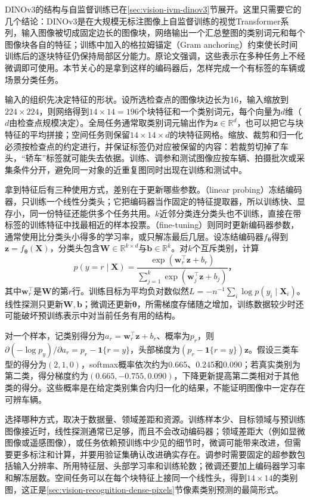 DINOv3的结构与自监督训练已在\ref{sec:vision-ivm-dinov3}节展开。这里只需要它的几个结论：DINOv3是在大规模无标注图像上自监督训练的视觉Transformer系列，输入图像被切成固定边长的图像块，网络输出一个汇总整图的类别词元和每个图像块各自的特征；训练中加入的格拉姆锚定（Gram anchoring）约束使长时间训练后的逐块特征仍保持局部区分能力。原论文强调，这些表示在多种任务上不经微调即可使用。本节关心的是拿到这样的编码器后，怎样完成一个有标签的车辆或场景分类任务。

输入的组织先决定特征的形状。设所选检查点的图像块边长为16，输入缩放到$224\times224$，则网络得到$14\times14=196$个块特征和一个类别词元，每个向量为$d$维（$d$由检查点规模决定）。全局任务通常取类别词元输出作为$\bm{z}\in\mathbb{R}^{d}$，也可以把它与块特征的平均拼接；空间任务则保留$14\times14\times d$的块特征网格。缩放、裁剪和归一化必须按检查点的约定进行，并保证标签仍对应被保留的内容：若裁剪切掉了车头，“轿车”标签就可能失去依据。训练、调参和测试图像应按车辆、拍摄批次或采集条件分开，避免同一对象的近重复图同时出现在训练和测试中。

拿到特征后有三种使用方式，差别在于更新哪些参数。（linear probing）冻结编码器，只训练一个线性分类头；它把编码器当作固定的特征提取器，所以训练快、显存小，同一份特征还能供多个任务共用。$k$近邻分类连分类头也不训练，直接在带标签的训练特征中找最相近的样本投票。（fine-tuning）则同时更新编码器参数，通常使用比分类头小得多的学习率，或只解冻最后几层。设冻结编码器$f_{\bm{\theta}}$得到$\bm{z}=f_{\bm{\theta}}(\bm{X})$，分类头包含$\bm{W}\in\mathbb{R}^{k\times d}$与$\bm{b}\in\mathbb{R}^{k}$。对$k$个互斥类别，计算
\begin{equation}
 p(y=r\mid\bm{X})=
 \frac{\exp(\bm{w}_r^\top\bm{z}+b_r)}
 {\sum_{j=1}^{k}\exp(\bm{w}_j^\top\bm{z}+b_j)}\text{，}
 \label{eq:vision-linear-head}
\end{equation}
其中$\bm{w}_r^\top$是$\bm{W}$的第$r$行。训练目标为平均负对数似然$L=-n^{-1}\sum_i\log p(y_i\mid\bm X_i)$。线性探测只更新$\bm{W},\bm{b}$；微调还更新$\bm{\theta}$，所需梯度存储随之增加，训练数据较少时还可能破坏预训练表示中对当前任务有用的结构。

对一个样本，记类别得分为$a_r=\bm{w}_r^\top\bm{z}+b_r$、概率为$p_r$，则$\partial(-\log p_y)/\partial a_r=p_r-\mathbf{1}\{r=y\}$，头部梯度为$(p_r-\mathbf{1}\{r=y\})\bm{z}$。假设三类车型的得分为$(2,1,0)$，softmax概率依次约为0.665、0.245和0.090；若真实类别为第二类，得分梯度约为$(0.665,-0.755,0.090)$，下降更新提高第二类相对于其他类的得分。这些概率是在给定类别集合内归一化的结果，不能证明图像中一定存在可辨车辆。

选择哪种方式，取决于数据量、领域差距和资源。训练样本少、目标领域与预训练图像接近时，线性探测通常已足够，而且不会改动编码器；领域差距大（例如显微图像或遥感图像），或任务依赖预训练中少见的细节时，微调可能带来改进，但需要更多标注和计算，并要用验证集确认改进确实存在。调参时需要固定的超参数包括输入分辨率、所用特征层、头部学习率和训练轮数；微调还要加上编码器学习率和解冻层数。空间任务可以在每个块特征上接同一个线性头，得到$14\times14$的类别图，这正是\ref{sec:vision-recognition-dense-pixels}节像素类别预测的最简形式。

